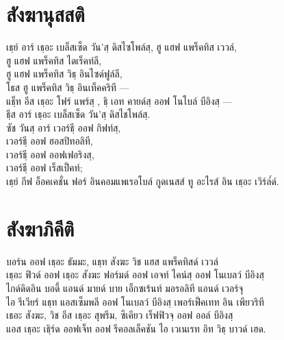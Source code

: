 \chapter{สังฆานุสสติ}

\begin{leader}
\end{leader}

\begin{thaitrans}
เธฺย์ อาร์ เธฺอะ เบล็สเซ็ด วัน’สฺ ดิสไซโพล์สฺ, ฮู แฮฟ แพร็คทิส เววล์,\\
ฮู แฮฟ แพร็คทิส ไดเร็คท์ลี,\\
ฮู แฮฟ แพร็คทิส วิธฺ อินไซด์ฟูล์ลี,\\
โธส ฮู  แพร็คทิส วิธฺ อินเท็คคริที —\\
แธฺ็ท อีส เธฺอะ โฟร์ แพร์สฺ , ธฺิ  เอท คายด์สฺ  ออฟ โนโบล์ บีอิงสฺ  —\\
ธฺีส อาร์ เธฺอะ เบล็สเซ็ด  วัน’สฺ  ดิสไชโพล์สฺ.\\
ซัช วันสฺ  อาร์ เวอร์ธฺี ออฟ กิฟท์สฺ,\\
เวอร์ธฺี ออฟ ฮอสปิทอลิที,\\
เวอร์ธฺี ออฟ ออฟเฟอริงสฺ,\\
เวอร์ธฺี ออฟ เร็สเป็คท์;\\
เธฺย์ กีฟ อ็อคเคชั่น ฟอร์ อินคอมแพเรอโบล์ กูดเนสส์ ทู อะไรส์ อิน เธฺอะ เวิร์ล๎ด์.\\
\end{thaitrans}

\chapter{สังฆาภิคีติ}

\begin{leader}
\end{leader}

\begin{thaitrans}
บอร์น ออฟ เธฺอะ ธัมมะ, แธฺท สังฆะ วิช แฮส แพร็คทิสด์ เววล์\\
เธฺอะ ฟิวด์ ออฟ เธฺอะ สังฆะ ฟอร์มด์ ออฟ เอจท์ ไคน์สฺ  ออฟ โนเบลว์ บีอิงสฺ\\
ไกด์ดิดอิน บอดี้ แอนด์ มายด์ บาย เอ็กซเร้นท์ มอรอลิที แอนด์ เวอร์จุ\\
ไอ รีเวียร์  แธฺท  แอสเซ็มพลี ออฟ โนเบลว์ บีอิงสฺ  เพอร์เฟ็คเทท อิน เพียวริที\\
เธอะ สังฆะ, วิช อีส เธฺอะ สุพรีม, ซีเคียว เร็ฟฟิวจฺ  ออฟ ออล์ บีอิงสฺ\\
แอส เธฺอะ เธฺิร์ด ออฟเจ็ท ออฟ รีคอลเล็คชัน ไอ เวเนเรท อิท วิธฺ บาวด์ เฮด.\\
\end{thaitrans}
\clearpage


